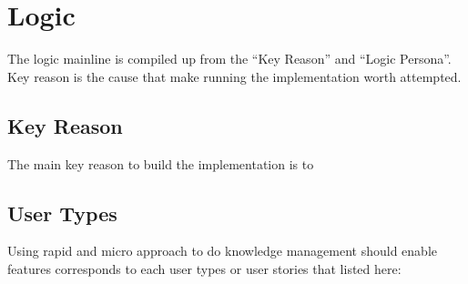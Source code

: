 \section{Logic}
\label{sec:logic}

The logic mainline is compiled up from the ``Key Reason'' and ``Logic Persona''.
Key reason is the cause that make running the implementation worth attempted.

\subsection{Key Reason}

The main key reason to build the implementation is to

\subsection{User Types}

Using rapid and micro approach to do knowledge management should enable features corresponds to each user types or user stories that listed here:

